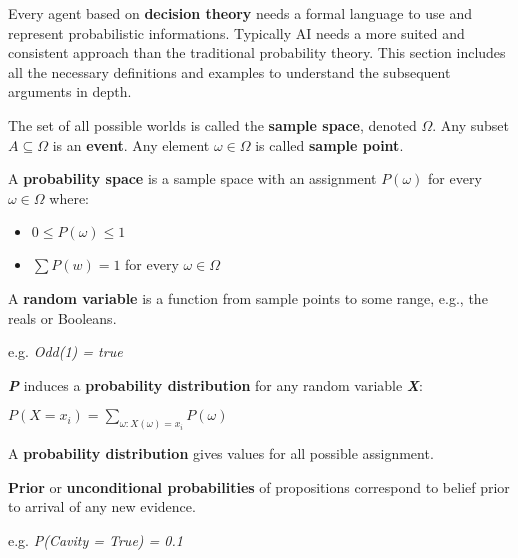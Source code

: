Every agent based on \textbf{decision theory} needs a formal language to use and represent probabilistic informations. Typically AI needs a more suited and consistent approach than the traditional probability theory. This section includes all the necessary definitions and examples to understand the subsequent arguments in depth.
\begin{definition}
    The set of all possible worlds is called the \textbf{sample space}, denoted $\Omega$. Any subset $A\subseteq\Omega$ is an \textbf{event}. Any element $\omega\in\Omega$ is called \textbf{sample point}.    
\end{definition}
\begin{definition}
    A \textbf{probability space} is a sample space with an assignment $P(\omega)$ for every $\omega\in\Omega$ where:
    \begin{itemize}
        \renewcommand{\labelitemi}{-}
        \item $0 \leq P(\omega) \leq 1$
        \item $\sum P(w) = 1$ for every $\omega\in\Omega$
    \end{itemize}
\end{definition}
\begin{definition}
    A \textbf{random variable} is a function from sample points to some range, e.g., the reals or Booleans. \vspace{3.5pt}

    e.g. \textit{Odd(1) = true}
\end{definition}
\begin{definition}
    \textit{\textbf{P}} induces a \textbf{probability distribution} for any random variable \textit{\textbf{X}}: \vspace{3.5pt}
    
    \begin{center}
        $P(X=x_i) = \sum_{\omega:X(\omega)=x_i} P(\omega)$
    \end{center} \vspace{3.5pt}
    
    A \textbf{probability distribution} gives values for all possible assignment.
\end{definition}
\begin{definition}
    \textbf{Prior} or \textbf{unconditional probabilities} of propositions correspond to belief prior to arrival of any new evidence. \vspace{3.5pt}

    e.g. \textit{P(Cavity = True) = 0.1}
\end{definition}
